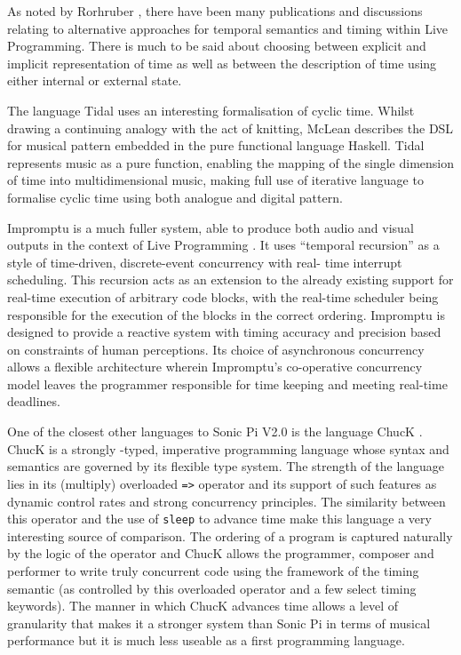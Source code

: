 \documentclass[11pt, abstracton, twoside, titlepage=true]{scrartcl}
\begin{document}
As noted by Rorhruber \cite{BMNR14}, there have been many publications and 
discussions relating to alternative approaches for temporal semantics and 
timing within Live Programming. There is much to be said about choosing 
between explicit and implicit representation of time as well as between the 
description of time using either internal or external state.

The language Tidal \cite{McL13} uses an interesting formalisation of cyclic 
time. Whilst drawing a continuing analogy with the act of knitting, McLean 
describes the DSL for musical pattern embedded in the pure functional language 
Haskell. Tidal represents music as a pure function, enabling the mapping of 
the single dimension of time into multidimensional music, making full use of 
iterative language to formalise cyclic time using both analogue and digital 
pattern.

Impromptu is a much fuller system, able to produce both audio and visual 
outputs in the context of Live Programming \cite{SG10}. It uses ``temporal 
recursion'' as a style of time-driven, discrete-event concurrency with real-
time interrupt scheduling. This recursion acts as an extension to the already 
existing support for real-time execution of arbitrary code blocks, with the 
real-time scheduler being responsible for the execution of the blocks in the 
correct ordering. Impromptu is designed to provide a reactive system with 
timing accuracy and precision based on constraints of human perceptions. Its 
choice of asynchronous concurrency allows a flexible architecture wherein 
Impromptu's co-operative concurrency model leaves the programmer responsible 
for time keeping and meeting real-time deadlines.

One of the closest other languages to Sonic Pi V2.0 is the language 
ChucK \cite{WC03}. ChucK is a strongly
-typed, imperative programming language whose syntax and semantics are 
governed by its flexible type system. The strength of the language lies in its 
(multiply) overloaded \texttt{=>} operator and its support of such features as 
dynamic control rates and strong concurrency principles. The similarity between 
this operator and the use of \texttt{sleep} to advance time make this language 
a very interesting source of comparison. The ordering of a 
program is captured naturally by the logic of the operator and ChucK allows 
the programmer, composer and performer to write truly concurrent code using 
the framework of the timing semantic (as controlled by this overloaded 
operator and a few select timing keywords). The manner in which ChucK advances 
time allows a level of granularity that makes it a stronger system than Sonic 
Pi in terms of musical performance but it is much less useable as a first 
programming language.
\end{document}
